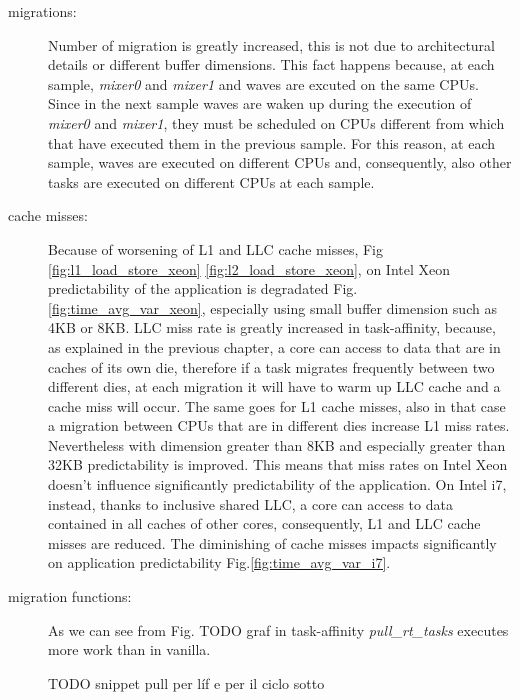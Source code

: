 \begin{description}
\item[migrations:] Number of migration is greatly increased, this is not due to architectural details or different buffer dimensions. This fact happens 
because, at each sample, \textit{mixer0} and \textit{mixer1} and waves are excuted on the same CPUs. Since in the next sample waves are waken up during the 
execution of \textit{mixer0} and \textit{mixer1}, they must be scheduled on CPUs different from which that have executed them in the previous sample. 
For this reason, at each sample, waves are executed on different CPUs and, consequently, also other tasks are executed on different CPUs at each sample.

\item[cache misses:] Because of worsening of L1 and LLC cache misses, Fig \ref{fig:l1_load_store_xeon} \ref{fig:l2_load_store_xeon}, on Intel Xeon 
predictability of the application is degradated Fig. \ref{fig:time_avg_var_xeon}, especially using small buffer dimension such as 4KB or 8KB. LLC miss rate 
is greatly increased in task-affinity, because, as explained in the previous chapter, a core can access to data that are in caches of its own die, 
therefore if a task migrates frequently between two different dies, at each migration it will have to warm up LLC cache and a cache miss will occur. The 
same goes for L1 cache misses, also in that case a migration between CPUs that are in different dies increase L1 miss rates. Nevertheless with dimension 
greater than 8KB and especially greater than 32KB predictability is improved. This means that miss rates on Intel Xeon doesn't influence significantly 
predictability of the application. On Intel i7, instead, thanks to inclusive shared LLC, a core can access to data contained in all caches of other cores, 
consequently, L1 and LLC cache misses are reduced. The diminishing of cache misses impacts significantly on application predictability 
Fig.\ref{fig:time_avg_var_i7}.

\item[migration functions:] As we can see from Fig. TODO graf in task-affinity \textit{pull\_rt\_tasks} executes more work than in vanilla. 

TODO snippet pull per l\'if e per il ciclo sotto


\end{description}
